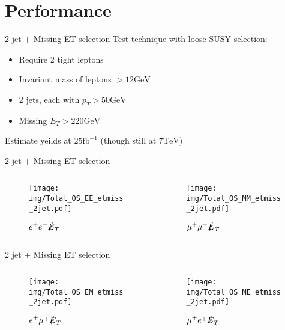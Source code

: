 \documentclass{beamer}
\begin{document}
\section{Performance}

\begin{frame}{2 jet + Missing ET selection}
Test technique with loose SUSY selection:
\begin{itemize}
\item Require 2 tight leptons
\item Invariant mass of leptons $> 12\text{GeV}$
\item 2 jets, each with $p_T > 50\text{GeV}$
\item Missing $E_T > 220\text{GeV}$
\end{itemize}
Estimate yeilds at $25\text{fb}^{-1}$ (though still at $7 \text{TeV}$)
\end{frame}

\begin{frame}{2 jet + Missing ET selection}
  \begin{columns}
    \begin{column}{0.45\textwidth}\begin{figure}
      \caption{$e^{+}e^{-}\slashed{E}_{T}$}
      \texttt{[image: img/Total\_OS\_EE\_etmiss\_2jet.pdf]}
    \end{figure}\end{column}
    \begin{column}{0.45\textwidth}\begin{figure}
      \caption{$\mu^{+}\mu^{-}\slashed{E}_{T}$}
      \texttt{[image: img/Total\_OS\_MM\_etmiss\_2jet.pdf]}
    \end{figure}\end{column}
  \end{columns}
\end{frame}

\begin{frame}{2 jet + Missing ET selection}
  \begin{columns}
    \begin{column}{0.45\textwidth}\begin{figure}
      \caption{$e^{\pm}\mu^{\mp}\slashed{E}_{T}$}
      \texttt{[image: img/Total\_OS\_EM\_etmiss\_2jet.pdf]}
    \end{figure}\end{column}
    \begin{column}{0.45\textwidth}\begin{figure}
      \caption{$\mu^{\pm}e^{\mp}\slashed{E}_{T}$}
      \texttt{[image: img/Total\_OS\_ME\_etmiss\_2jet.pdf]}
    \end{figure}\end{column}
  \end{columns}
\end{frame}
\end{document}
